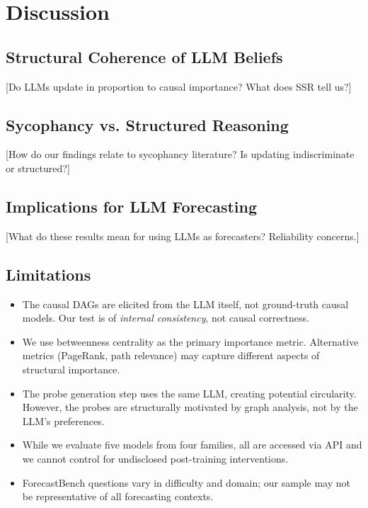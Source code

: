 \documentclass[11pt]{article}
\begin{document}
\section{Discussion}
\label{sec:discussion}


\subsection{Structural Coherence of LLM Beliefs}

[Do LLMs update in proportion to causal importance? What does SSR tell us?]

\subsection{Sycophancy vs. Structured Reasoning}

[How do our findings relate to sycophancy literature? Is updating indiscriminate or structured?]

\subsection{Implications for LLM Forecasting}

[What do these results mean for using LLMs as forecasters? Reliability concerns.]

\subsection{Limitations}

\begin{itemize}
    \item The causal DAGs are elicited from the LLM itself, not ground-truth causal models. Our test is of \textit{internal consistency}, not causal correctness.
    \item We use betweenness centrality as the primary importance metric. Alternative metrics (PageRank, path relevance) may capture different aspects of structural importance.
    \item The probe generation step uses the same LLM, creating potential circularity. However, the probes are structurally motivated by graph analysis, not by the LLM's preferences.
    \item While we evaluate five models from four families, all are accessed via API and we cannot control for undisclosed post-training interventions.
    \item ForecastBench questions vary in difficulty and domain; our sample may not be representative of all forecasting contexts.
\end{itemize}
\end{document}
